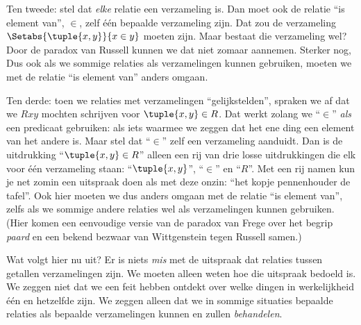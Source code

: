 \documentclass[openany]{memoir}
\begin{document}
Ten tweede: stel dat \emph{elke} relatie een verzameling is. Dan moet
ook de relatie ``is element van'', $\in$, zelf één bepaalde
verzameling zijn. Dat zou de verzameling
$\Setabs{\tuple{x,y}}{x \in y}$ moeten zijn. Maar bestaat die
verzameling wel? Door de paradox van Russell kunnen we dat niet zomaar
aannemen. Sterker nog,
Dus ook als we sommige relaties als verzamelingen kunnen gebruiken,
moeten we met de relatie ``is element van'' anders omgaan.

Ten derde: toen we relaties met verzamelingen ``gelijkstelden'',
spraken we af dat we $Rxy$ mochten schrijven voor $\tuple{x,y} \in R$.
Dat werkt zolang we ``$\in$'' \emph{als} een predicaat gebruiken: als
iets waarmee we zeggen dat het ene ding een element van het andere is.
Maar stel dat ``$\in$'' zelf een verzameling aanduidt. Dan is de
uitdrukking ``$\tuple{x,y} \in R$'' alleen een rij van drie losse
uitdrukkingen die elk voor één verzameling staan: ``$\tuple{x,y}$'', ``$\in$''
en ``$R$''. Met een rij namen kun je net zomin een uitspraak doen als
met deze onzin: ``het kopje pennenhouder de tafel''. Ook hier moeten we
dus anders omgaan met de relatie ``is element van'', zelfs als we
sommige andere relaties wel als verzamelingen kunnen gebruiken. (Hier
komen een eenvoudige versie van de paradox van Frege over het begrip
\emph{paard} en een bekend bezwaar van Wittgenstein tegen Russell
samen.)

Wat volgt hier nu uit? Er is niets \emph{mis} met de uitspraak dat
relaties tussen getallen verzamelingen zijn. We moeten alleen weten hoe
die uitspraak bedoeld is. We zeggen niet dat we een feit hebben ontdekt
over welke dingen in werkelijkheid één en hetzelfde zijn. We zeggen alleen dat
we in sommige situaties bepaalde relaties als bepaalde verzamelingen
kunnen en zullen \emph{behandelen}.
\endgroup

\begingroup
\def\olfilename{OLP-0014}
\def\olfilepath{content/sets-functions-relations/relations/}
\hypertarget{unit-OLP-0014}{}
\end{document}
